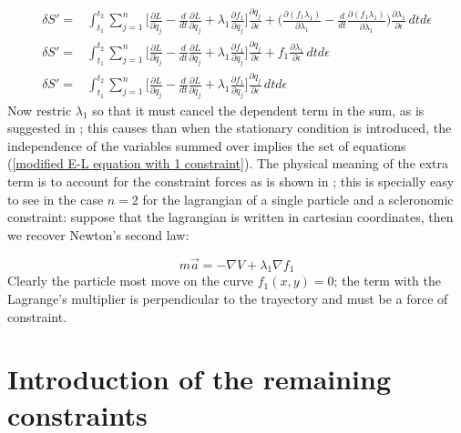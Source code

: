 \documentclass{article}
\begin{document}
\begin{equation*} \label{first variation of the modified lagrangian with 1 constraint}
\begin{split}
	\delta S' =& \int_{t_1}^{t_2} \sum_{j=1}^{n} \bigg[ \frac{\partial L}{\partial {q_j}} -\frac{d}{dt}\frac{\partial L}{\partial \dot{q_j}} +\lambda_1 \frac{\partial f_1}{\partial q_j} \bigg]\frac{\partial q_j}{\partial \epsilon} + \bigg(\frac{\partial (f_1 \lambda_1)}{\partial \lambda_1} -\frac{d}{dt}\frac{\partial (f_1 \lambda_1)}{\partial \dot{\lambda}_1} \bigg)\frac{\partial \lambda_1}{\partial \epsilon}  \, dtd\epsilon\\
\delta S' =& \int_{t_1}^{t_2} \sum_{j=1}^{n} \bigg[ \frac{\partial L}{\partial {q_j}} -\frac{d}{dt}\frac{\partial L}{\partial \dot{q_j}} +\lambda_1 \frac{\partial f_1}{\partial q_j} \bigg]\frac{\partial q_j}{\partial \epsilon} + f_1 \frac{\partial \lambda_1}{\partial \epsilon} \, dtd\epsilon \\
\delta S' =& \int_{t_1}^{t_2} \sum_{j=1}^{n} \bigg[ \frac{\partial L}{\partial {q_j}} -\frac{d}{dt}\frac{\partial L}{\partial \dot{q_j}} +\lambda_1 \frac{\partial f_1}{\partial q_j} \bigg]\frac{\partial q_j}{\partial \epsilon} \, dtd\epsilon 
\end{split}
\end{equation*}
\justify
Now restric $\lambda_1$ so that it must cancel the dependent term in the sum, as is suggested in \cite{goldstein2002classical}; this causes than when the stationary condition is introduced, the independence of the variables summed over implies the set of equations (\ref{modified E-L equation with 1 constraint}). The physical meaning of the extra term is to account for the constraint forces as is shown in \cite{goldstein2002classical}; this is specially easy to see in the case $n=2$ for the lagrangian of a single particle and a scleronomic constraint: suppose that the lagrangian is written in cartesian coordinates, then we recover Newton's second law:

\begin{equation}
m\vec{a} = -\nabla V + \lambda_1 \nabla f_1  
\end{equation}
\justify
Clearly the particle most move on the curve $f_1(x,y)=0$; the term with the Lagrange's multiplier is perpendicular to the trayectory and must be a force of constraint.
\pagebreak
\section{Introduction of the remaining constraints} 
\end{document}

